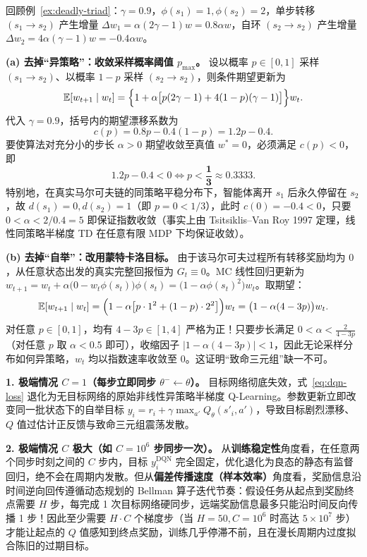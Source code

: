 
回顾例~\ref{ex:deadly-triad}：$\gamma = 0.9$，$\phi(s_1) = 1, \phi(s_2) = 2$，单步转移 $(s_1 \to s_2)$ 产生增量 $\Delta w_1 = \alpha(2\gamma - 1)w = 0.8\alpha w$，自环 $(s_2 \to s_2)$ 产生增量 $\Delta w_2 = 4\alpha(\gamma - 1)w = -0.4\alpha w$。

\textbf{(a) 去掉“异策略”：收敛采样概率阈值 $p_{\max}$。} 设以概率 $p \in [0, 1]$ 采样 $(s_1 \to s_2)$、以概率 $1 - p$ 采样 $(s_2 \to s_2)$，则条件期望更新为
\[
  \mathbb{E}[w_{t+1} \mid w_t] = \Big\{1 + \alpha\big[p(2\gamma - 1) + 4(1 - p)(\gamma - 1)\big]\Big\} w_t.
\]
代入 $\gamma = 0.9$，括号内的期望漂移系数为
\[
  c(p) = 0.8p - 0.4(1 - p) = 1.2p - 0.4.
\]
要使算法对充分小的步长 $\alpha > 0$ 期望收敛至真值 $w^* = 0$，必须满足 $c(p) < 0$，即
\[
  1.2p - 0.4 < 0 \iff p < \mathbf{\frac{1}{3} \approx 0.3333}.
\]
特别地，在真实马尔可夫链的同策略平稳分布下，智能体离开 $s_1$ 后永久停留在 $s_2$，故 $d(s_1) = 0, d(s_2) = 1$（即 $p = 0 < 1/3$），此时 $c(0) = -0.4 < 0$，只要 $0 < \alpha < 2 / 0.4 = 5$ 即保证指数收敛（事实上由 Tsitsiklis--Van Roy 1997 定理，线性同策略半梯度 TD 在任意有限 MDP 下均保证收敛）。

\textbf{(b) 去掉“自举”：改用蒙特卡洛目标。} 由于该马尔可夫过程所有转移奖励均为 $0$，从任意状态出发的真实完整回报恒为 $G_t \equiv 0$。MC 线性回归更新为 $w_{t+1} = w_t + \alpha\big(0 - w_t \phi(s_t)\big)\phi(s_t) = \big(1 - \alpha \phi(s_t)^2\big) w_t$。取期望：
\[
  \mathbb{E}[w_{t+1} \mid w_t] = \Big(1 - \alpha\big[p \cdot 1^2 + (1 - p)\cdot 2^2\big]\Big) w_t = \big(1 - \alpha(4 - 3p)\big) w_t.
\]
对任意 $p \in [0, 1]$，均有 $4 - 3p \in [1, 4]$ 严格为正！只要步长满足 $0 < \alpha < \frac{2}{4 - 3p}$（对任意 $p$ 取 $\alpha < 0.5$ 即可），收缩因子 $|1 - \alpha(4 - 3p)| < 1$，因此无论采样分布如何异策略，$w_t$ 均以指数速率收敛至 $0$。这证明“致命三元组”缺一不可。


\textbf{1. 极端情况 $C = 1$（每步立即同步 $\theta^- \leftarrow \theta$）。} 目标网络彻底失效，式~\eqref{eq:dqn-loss} 退化为无目标网络的原始非线性异策略半梯度 Q-Learning。参数更新立即改变同一批状态下的自举目标 $y_i = r_i + \gamma \max_{a'} Q_\theta(s'_i, a')$，导致目标剧烈漂移、$Q$ 值过估计正反馈与致命三元组震荡发散。

\textbf{2. 极端情况 $C$ 极大（如 $C = 10^6$ 步同步一次）。} 从\textbf{训练稳定性}角度看，在任意两个同步时刻之间的 $C$ 步内，目标 $y_i^{\mathrm{DQN}}$ 完全固定，优化退化为良态的静态有监督回归，绝不会在周期内发散。但从\textbf{偏差传播速度（样本效率）}角度看，奖励信息沿时间逆向回传遵循动态规划的 Bellman 算子迭代节奏：假设任务从起点到奖励终点需要 $H$ 步，每完成 1 次目标网络硬同步，远端奖励信息最多只能沿时间反向传播 1 步！因此至少需要 $H \cdot C$ 个梯度步（当 $H = 50, C = 10^6$ 时高达 $5 \times 10^7$ 步）才能让起点的 $Q$ 值感知到终点奖励，训练几乎停滞不前，且在漫长周期内过度拟合陈旧的过期目标。

